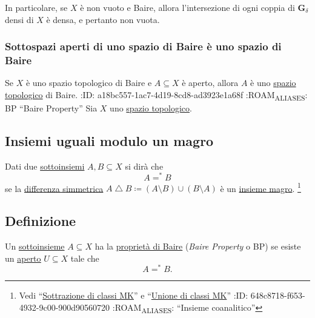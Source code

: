 \documentclass{article}
\newcommand{\1}{\mathds{1}}
\begin{document}
In particolare, se \(X\) è non vuoto e Baire, allora l'intersezione di ogni coppia di \href{../../../../../../../org/roam/20250304152026-sottoinsiemi_gdelta_e_fsigma.org}{\(\bm{G}_{\delta}\)} densi di \(X\) è densa, e pertanto non vuota.
\subsubsection{Sottospazi aperti di uno spazio di Baire è uno spazio di Baire}
\label{sec:orgce12667}
Se \(X\) è uno spazio topologico di Baire e \(A \subseteq X\) è aperto, allora \(A\) è uno \href{../../../../../../../org/roam/20250103163814-sottospazio_topologico.org}{spazio topologico} di Baire.
:ID:       a18bc557-1ac7-4d19-8cd8-ad3923e1a68f
:ROAM\textsubscript{ALIASES}: BP ``Baire Property''
Sia \(X\) uno \href{../../../../../../../org/roam/20250103145124-topologia.org}{spazio topologico}.
\subsection{Insiemi uguali modulo un magro}
\label{sec:orgeba7346}
Dati due \href{../../../../../../../org/roam/20250131155822-operazioni_insiemistiche_tra_classi_mk.org}{sottoinsiemi} \(A, B \subseteq X\) si dirà che
\begin{equation*}
A \mathrel{=^{*}} B
\end{equation*}
se la \href{../../../../../../../org/roam/20250514162818-differenza_simmetrica_tra_due_insiemi.org}{differenza simmetrica} \(A\mathrel{\triangle} B \coloneqq (A\setminus B)\cup (B\setminus A)\) è un \href{../../../../../../../org/roam/20250419122752-insieme_magro.org}{insieme magro}. \footnote{Vedi ``\href{../../../../../../../org/roam/20250131155822-operazioni_insiemistiche_tra_classi_mk.org}{Sottrazione di classi MK}'' e ``\href{../../../../../../../org/roam/20250131155822-operazioni_insiemistiche_tra_classi_mk.org}{Unione di classi MK}''
:ID:       648c8718-f653-4932-9c00-900d90560720
:ROAM\textsubscript{ALIASES}: ``Insieme coanalitico''}
\subsection{Definizione}
\label{sec:org95bdf49}

Un \href{../../../../../../../org/roam/20250131155822-operazioni_insiemistiche_tra_classi_mk.org}{sottoinsieme} \(A \subseteq X\) ha la \uline{proprietà di Baire} (\emph{Baire Property} o BP) se esiste un \uline{\href{../../../../../../../org/roam/20250103145124-topologia.org}{aperto}} \(U \subseteq X\) tale che
\begin{equation*}
A\mathrel{=^{*}}B.
\end{equation*}
\end{document}

